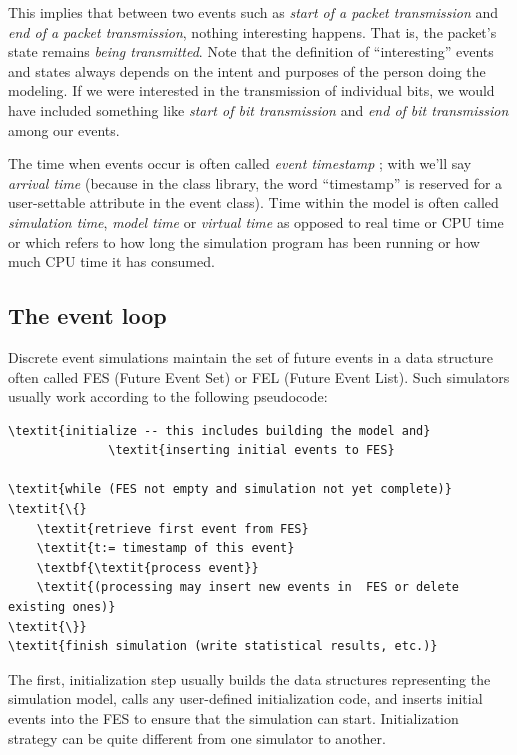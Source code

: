 This implies that between two events such as \textit{start of a packet
transmission} and \textit{end of a packet transmission}, nothing
interesting happens. That is, the packet's state remains \textit{being
transmitted}. Note that the definition of ``interesting'' events and states always
depends on the intent and purposes of the person doing the modeling.
If we were interested in the transmission of individual bits, we would
have included something like \textit{start of bit transmission} and
\textit{end of bit transmission} among our events.


The time when events occur is often called \textit{event timestamp}
; with {\opp} we'll say
\textit{arrival time} (because in the class
library, the word ``timestamp'' is reserved for a user-settable
attribute in the event class). Time within the model is often called
\textit{simulation time}, \textit{model time}
 or \textit{virtual time}
as opposed to real time or CPU time
or which refers to how long the simulation program has been running or
how much CPU time it has consumed.



\subsection{The event loop}

Discrete event simulations maintain the set of future
events in a data structure often called
FES (Future Event Set) or FEL (Future Event List).
Such simulators usually work according to the following pseudocode:

\begin{Verbatim}[commandchars=\\\{\}]
\textit{initialize -- this includes building the model and}
              \textit{inserting initial events to FES}

\textit{while (FES not empty and simulation not yet complete)}
\textit{\{}
    \textit{retrieve first event from FES}
    \textit{t:= timestamp of this event}
    \textbf{\textit{process event}}
    \textit{(processing may insert new events in  FES or delete existing ones)}
\textit{\}}
\textit{finish simulation (write statistical results, etc.)}
\end{Verbatim}


The first, initialization step usually builds the data structures
representing the simulation model, calls any user-defined
initialization code, and inserts initial events
into the FES to ensure that the simulation can start. Initialization
strategy can be quite different from one simulator to another.


